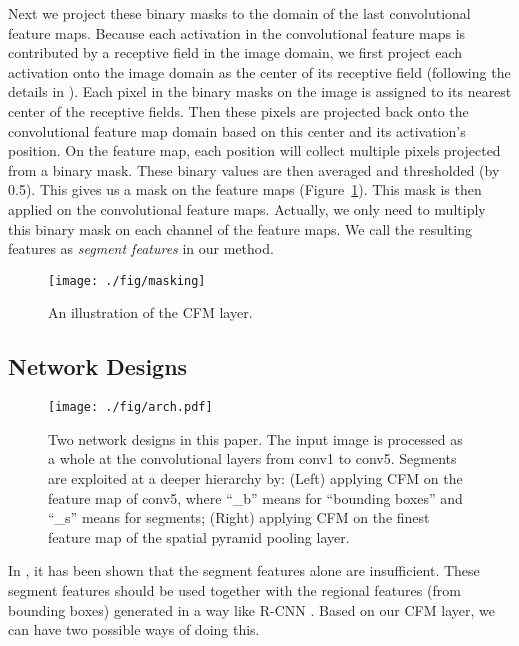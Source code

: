 \documentclass[10pt,twocolumn,letterpaper]{article}
\begin{document}
Next we project these binary masks to the domain of the last convolutional feature maps. Because each activation in the convolutional feature maps is contributed by a receptive field in the image domain, we first project each activation onto the image domain as the center of its receptive field (following the details in \cite{he2014spatial}). Each pixel in the binary masks on the image is assigned to its nearest center of the receptive fields. Then these pixels are projected back onto the convolutional feature map domain based on this center and its activation's position. On the feature map, each position will collect multiple pixels projected from a binary mask. These binary values are then averaged and thresholded (by 0.5). This gives us a mask on the feature maps (Figure~\ref{fig:feature_map_masking}).
This mask is then applied on the convolutional feature maps. Actually, we only need to multiply this binary mask on each channel of the feature maps. We call the resulting features as \emph{segment features} in our method.

\begin{figure}
  \centering
     \texttt{[image: ./fig/masking]}\\
  \caption{An illustration of the CFM layer.}
  \label{fig:feature_map_masking}
\end{figure}


\subsection{Network Designs}

\begin{figure*}
  \centering
     \texttt{[image: ./fig/arch.pdf]}\\
  \caption{Two network designs in this paper. The input image is processed as a whole at the convolutional layers from conv1 to conv5. Segments are exploited at a deeper hierarchy by: (Left) applying CFM on the feature map of conv5, where ``\_b'' means for ``bounding boxes'' and ``\_s'' means for segments; (Right) applying CFM on the finest feature map of the spatial pyramid pooling layer.}
  \label{fig:network_architecture}
\end{figure*}

In \cite{hariharan2014simultaneous}, it has been shown that the segment features alone are insufficient. These segment features should be used together with the regional features (from bounding boxes) generated in a way like R-CNN \cite{girshick2013rich}. Based on our CFM layer, we can have two possible ways of doing this.
\end{document}
